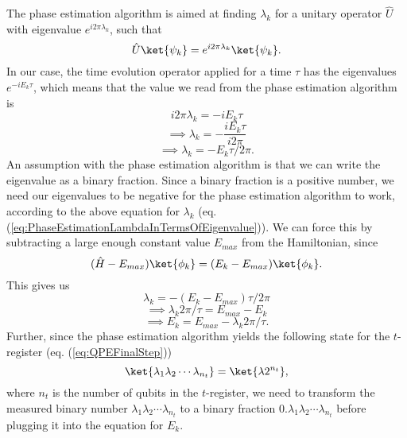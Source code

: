 The phase estimation algorithm is aimed at finding $\lambda_k$ for a unitary operator $\hat{U}$ with eigenvalue $e^{i2\pi \lambda_k}$, such that
\begin{equation*}
    \hat{U}\ket{\psi_k} = e^{i2\pi\lambda_k}\ket{\psi_k}.
\end{equation*}
In our case, the time evolution operator applied for a time $\tau$ has the eigenvalues $e^{-iE_k \tau}$, which means that the value we read from the phase estimation algorithm is 
$$ i2\pi \lambda_k = - iE_k \tau $$
$$ \implies \lambda_k = -\frac{iE_k\tau}{i2\pi} $$
\begin{equation}
    \label{eq:PhaseEstimationLambdaInTermsOfEigenvalue}
    \implies \lambda_k = -E_k \tau /2\pi.
\end{equation}
An assumption with the phase estimation algorithm is that we can write the eigenvalue as a binary fraction. Since a binary fraction is a positive number, we need our eigenvalues to be negative for the phase estimation algorithm to work, according to the above equation for $\lambda_k$ (eq. (\ref{eq:PhaseEstimationLambdaInTermsOfEigenvalue})). We can force this by subtracting a large enough constant value $E_{max}$ from the Hamiltonian, since $$(\hat{H} - E_{max})\ket{\phi_k} = (E_k - E_{max})\ket{\phi_k}.$$
This gives us
$$\lambda_k = -(E_k - E_{max})\tau /2\pi $$
$$\implies \lambda_k 2\pi / \tau = E_{max} - E_k $$
\begin{equation}
    \label{eq:PhaseEstimationMeasurementToEigenvalue}
   \implies E_k = E_{max} - \lambda_k 2\pi/\tau.
\end{equation}
Further, since the phase estimation algorithm yields the following state for the $t$-register (eq. (\ref{eq:QPEFinalStep}))
$$\ket{\lambda_1 \lambda_2 \cdots \lambda_{n_t}} =\ket{\lambda 2^{n_t}},$$
where $n_t$ is the number of qubits in the $t$-register,
we need to transform the measured binary number $\lambda_1 \lambda_2 \cdots \lambda_{n_t}$ to a binary fraction $0.\lambda_1 \lambda_2 \cdots \lambda_{n_t}$ before plugging it into the equation for $E_k$.


